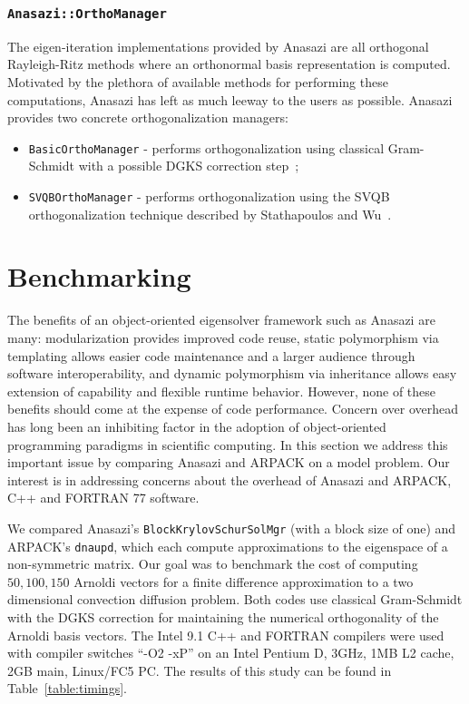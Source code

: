 \documentclass[acmtoms,acmnow]{acmtrans2m}
\newcommand{\aspace}[1]{\texttt{#1}}
\begin{document}
\subsubsection{\aspace{Anasazi::OrthoManager}}

The eigen-iteration implementations provided by Anasazi are all orthogonal 
Rayleigh-Ritz methods where an orthonormal basis representation is computed. 
Motivated by the plethora of available methods for performing these 
computations, Anasazi has left as much leeway to the users as possible. 
Anasazi provides two concrete orthogonalization managers:
\begin{itemize}
\item
  \aspace{BasicOrthoManager} - performs orthogonalization using
  classical Gram-Schmidt with a possible DGKS correction step~\cite{dgks:76};
\item
  \aspace{SVQBOrthoManager} - performs orthogonalization using the
  SVQB orthogonalization technique described by Stathapoulos and
  Wu~\cite{Stathopoulos:2002:BOP}.
\end{itemize}

\section{Benchmarking}
\label{sec:benchmarking}

The benefits of an object-oriented eigensolver framework such as Anasazi are many:
modularization provides improved code reuse, static polymorphism via templating allows
easier code maintenance and a larger audience through software interoperability, and
dynamic polymorphism via inheritance allows easy extension of capability and flexible
runtime behavior. However, none of these benefits should come at the expense of code
performance. Concern over overhead has long been an inhibiting factor in the adoption of
object-oriented programming paradigms in scientific computing. In this section we 
address this important issue by comparing Anasazi and ARPACK on a model problem. Our
interest is in addressing concerns about the overhead of Anasazi and ARPACK, C++ and
FORTRAN 77 software.

We compared Anasazi's \aspace{BlockKrylovSchurSolMgr} (with a block size
of one) and ARPACK's \aspace{dnaupd}, which each compute approximations to the
eigenspace of a non-symmetric matrix. Our goal was to benchmark the
cost of computing $50, 100, 150$ Arnoldi vectors for a finite
difference approximation to a two dimensional convection diffusion
problem. Both codes use classical Gram-Schmidt with the DGKS \cite{dgks:76} 
correction for maintaining the numerical orthogonality of the Arnoldi basis
vectors.  The Intel 9.1 C++ and FORTRAN compilers were used with
compiler switches ``-O2 -xP'' on an Intel Pentium D, 3GHz, 1MB L2
cache, 2GB main, Linux/FC5 PC.  The results of this study can be found
in Table~\ref{table:timings}.
\end{document}
